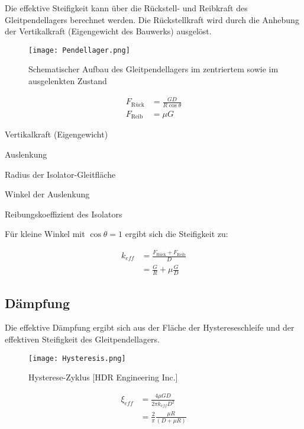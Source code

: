 Die effektive Steifigkeit kann über die Rückstell- und Reibkraft des Gleitpendellagers berechnet werden. Die Rückstellkraft wird durch die Anhebung der Vertikalkraft (Eigengewicht des Bauwerks) ausgelöst. \cite{Pocanschi}

\begin{figure}[H]
    \centering
    \texttt{[image: Pendellager.png]}
    \caption{Schematischer Aufbau des Gleitpendellagers im zentriertem sowie im ausgelenkten Zustand \cite{Romen}}
\end{figure}

\begin{align*}
F_{\text{Rück}} &= \frac{G D}{R \cos \theta}\\
F_{\text{Reib}} &= \mu G
\end{align*}

  Vertikalkraft (Eigengewicht)\par
{}  Auslenkung\par
{}  Radius der Isolator-Gleitfläche\par
\makebox[0.8cm]{$\theta$}  Winkel der Auslenkung\par
\makebox[0.8cm]{$\mu$}  Reibungskoeffizient des Isolators\par

Für kleine Winkel mit $\cos \theta = 1$ ergibt sich die Steifigkeit zu:

\begin{align}
k_{eff} &= \frac{F_{\text{Rück}} + F_{\text{Reib}}}{D}\nonumber\\
        &= \frac{G}{R} + \mu \frac{G}{D}\label{keff}
\end{align}

\subsection{Dämpfung}
\label{sec:daempdung}

Die effektive Dämpfung ergibt sich aus der Fläche der Hystereseschleife und der effektiven Steifigkeit des Gleitpendellagers. \cite{Huber}\cite{Pocanschi}

\begin{figure}[h]
    \centering
    \texttt{[image: Hysteresis.png]}
    \caption{Hysterese-Zyklus [HDR Engineering Inc.]}
\end{figure}

\begin{align}
\xi_{eff} &= \frac{4 \mu G D}{2 \pi k_{eff} D^2}\nonumber\\
          &= \frac{2}{\pi} \frac{\mu R}{(D + \mu R)}\label{xieff}
\end{align}



